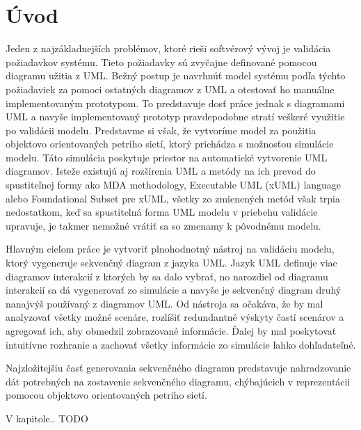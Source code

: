 \theoremstyle{definition}
\newtheorem{defn}{Definícia}[section]
\newtheorem{note}{Poznámka}[section]
\newtheorem{exmpl}{Príklad}[section]

\chapter{Úvod}



Jeden z najzákladnejších problémov, ktoré rieši softvérový vývoj je validácia požiadavkov systému. Tieto požiadavky sú zvyčajne definované pomocou diagramu užitia z UML. 
Bežný postup je navrhnúť model systému podľa týchto požiadaviek za pomoci ostatných diagramov z UML a otestovať ho manuálne implementovaným prototypom. To predstavuje dosť práce jednak s diagramami UML a navyše implementovaný prototyp pravdepodobne stratí veškeré využitie po validácii modelu. Predstavme si však, že vytvoríme model za použitia objektovo orientovaných petriho sietí, ktorý prichádza s možnosťou simulácie modelu. Táto simulácia poskytuje priestor na automatické vytvorenie UML diagramov. Isteže existujú aj rozšírenia UML a metódy na ich prevod do spustiteľnej formy ako MDA methodology, Executable UML (xUML) language alebo Foundational Subset pre xUML, všetky zo zmienených metód však trpia nedostatkom, keď sa spustitelná forma UML modelu v priebehu validácie upravuje, je takmer nemožné vrátiť sa so zmenamy k pôvodnému modelu. 

Hlavným cieľom práce je vytvoriť plnohodnotný nástroj na validáciu modelu, ktorý vygeneruje sekvenčný diagram z jazyka UML. Jazyk UML definuje viac diagramov interakcií z ktorých by sa dalo vybrať, no narozdiel od diagramu interakcií sa dá vygenerovať zo simulácie a navyše je sekvenčný diagram druhý nanajvýš používaný z diagramov UML. Od nástroja sa očakáva, že by mal analyzovať všetky možné scenáre, rozlíšiť redundantné výskyty častí scenárov a agregovať ich, aby obmedzil zobrazované informácie. Ďalej by mal poskytovať intuitívne rozhranie a zachovať všetky informácie zo simulácie ľahko dohľadateľné.

Najzložitejšiu časť generovania sekvenčného diagramu predstavuje nahradzovanie dát potrebných na zostavenie sekvenčného diagramu, chýbajúcich v reprezentácii pomocou objektovo orientovaných petriho sietí.

V kapitole.. TODO

